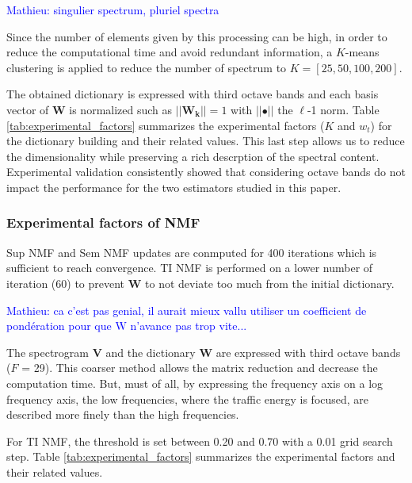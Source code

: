 \documentclass[twocolumn,a4paper,10pt]{article}
\newcommand{\ml}[1]{\textcolor{blue}{ Mathieu: #1}}
\begin{document}
\ml{singulier spectrum, pluriel spectra}

Since the number of elements given by this processing can be high, in order to reduce the computational time and avoid redundant information, a $K$-means clustering is applied to reduce the number of spectrum to $K = \left[ 25, 50, 100, 200\right]$.

The obtained dictionary is expressed with third octave bands and each basis vector of $\mathbf{W}$ is normalized such as $\vert \vert \mathbf{W_k} \vert \vert = 1$ with $\vert \vert \bullet \vert\vert$ the $\ell$-1 norm. Table \ref{tab:experimental_factors} summarizes the experimental factors ($K$ and $w_t$) for the dictionary building and their related values. This last step allows us to reduce the dimensionality while preserving a rich descrption of the spectral content. Experimental validation consistently showed that considering octave bands do not impact the performance for the two estimators studied in this paper.

\subsubsection{Experimental factors of NMF}

Sup NMF and Sem NMF updates are conmputed for 400 iterations which is sufficient to reach convergence. TI NMF is performed on a lower number of iteration (60) to prevent $\mathbf{W}$ to not deviate too much from the initial dictionary.

\ml{ca c'est pas genial, il aurait mieux vallu utiliser un coefficient de pondération pour que W n'avance pas trop vite...}

The spectrogram $\mathbf{V}$ and the dictionary $\mathbf{W}$ are expressed with third octave bands ($F$ = 29). This coarser method allows the matrix reduction and decrease the computation time. But,  must of all, by expressing the frequency axis on a log frequency axis,  the low frequencies, where the traffic energy is focused, are described more finely than the high frequencies.%

For TI NMF, the threshold is set between 0.20 and 0.70 with a 0.01 grid search step. Table \ref{tab:experimental_factors} summarizes the experimental factors and their related values.
\end{document}
